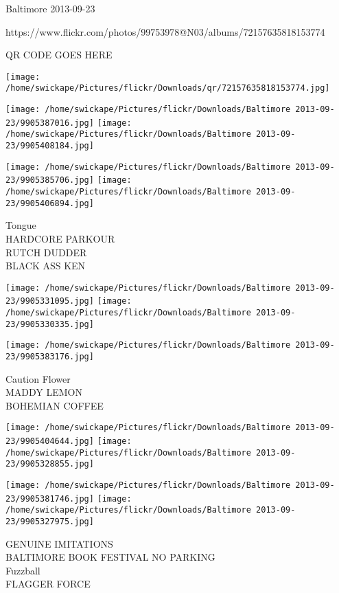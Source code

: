 \documentclass[10pt,letterpaper]{article}
\begin{document}
Baltimore 2013-09-23

https://www.flickr.com/photos/99753978@N03/albums/72157635818153774

QR CODE GOES HERE

\texttt{[image: /home/swickape/Pictures/flickr/Downloads/qr/72157635818153774.jpg]}
\pagebreak

\texttt{[image: /home/swickape/Pictures/flickr/Downloads/Baltimore 2013-09-23/9905387016.jpg]}
\texttt{[image: /home/swickape/Pictures/flickr/Downloads/Baltimore 2013-09-23/9905408184.jpg]}

\texttt{[image: /home/swickape/Pictures/flickr/Downloads/Baltimore 2013-09-23/9905385706.jpg]}
\texttt{[image: /home/swickape/Pictures/flickr/Downloads/Baltimore 2013-09-23/9905406894.jpg]}

Tongue\\
HARDCORE PARKOUR\\
RUTCH DUDDER\\
BLACK ASS KEN\\
\pagebreak

\texttt{[image: /home/swickape/Pictures/flickr/Downloads/Baltimore 2013-09-23/9905331095.jpg]}
\texttt{[image: /home/swickape/Pictures/flickr/Downloads/Baltimore 2013-09-23/9905330335.jpg]}

\vspace{0.25in}
\texttt{[image: /home/swickape/Pictures/flickr/Downloads/Baltimore 2013-09-23/9905383176.jpg]}

Caution Flower\\
MADDY LEMON\\
BOHEMIAN COFFEE\\
\pagebreak

\texttt{[image: /home/swickape/Pictures/flickr/Downloads/Baltimore 2013-09-23/9905404644.jpg]}
\texttt{[image: /home/swickape/Pictures/flickr/Downloads/Baltimore 2013-09-23/9905328855.jpg]}

\texttt{[image: /home/swickape/Pictures/flickr/Downloads/Baltimore 2013-09-23/9905381746.jpg]}
\texttt{[image: /home/swickape/Pictures/flickr/Downloads/Baltimore 2013-09-23/9905327975.jpg]}

GENUINE IMITATIONS\\
BALTIMORE BOOK FESTIVAL NO PARKING\\
Fuzzball\\
FLAGGER FORCE\\
\pagebreak
\end{document}
